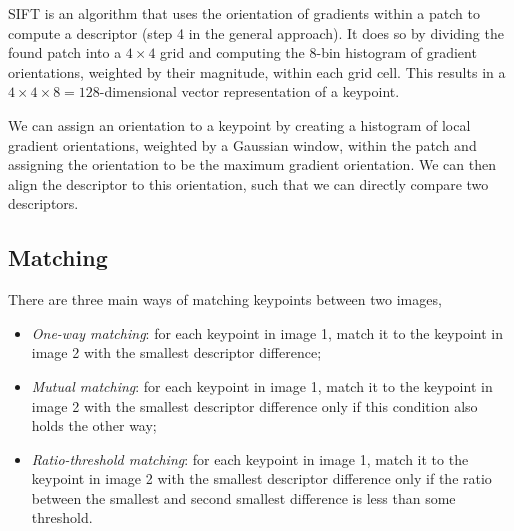 SIFT \citep{lowe2004distinctive} is an algorithm that uses the orientation of
gradients within a patch to compute a descriptor (step 4 in the general
approach). It does so by dividing the found patch into a $4\times 4$ grid and
computing the 8-bin histogram of gradient orientations, weighted by their
magnitude, within each grid cell. This results in a $4\times 4\times
8=128$-dimensional vector representation of a keypoint.

We can assign an orientation to a keypoint by creating a histogram of local
gradient orientations, weighted by a Gaussian window, within the patch and
assigning the orientation to be the maximum gradient orientation. We can then
align the descriptor to this orientation, such that we can directly compare two
descriptors.

\subsection{Matching}

There are three main ways of matching keypoints between two images,
\begin{itemize}
  \item \textit{One-way matching}: for each keypoint in image 1, match it to the
    keypoint in image 2 with the smallest descriptor difference;
  \item \textit{Mutual matching}: for each keypoint in image 1, match it to the
    keypoint in image 2 with the smallest descriptor difference only if this condition
    also holds the other way;
  \item \textit{Ratio-threshold matching}: for each keypoint in image 1, match
    it to the keypoint in image 2 with the smallest descriptor difference only
    if the ratio between the smallest and second smallest difference is less
    than some threshold.
\end{itemize}

